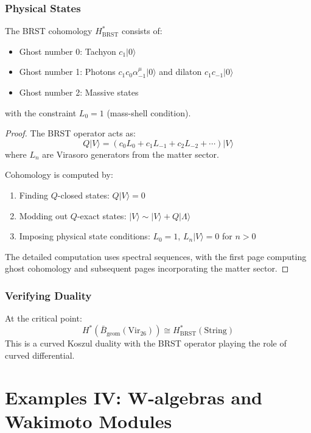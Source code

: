 \subsubsection{Physical States}
 
\begin{theorem}
The BRST cohomology $H^*_{\text{BRST}}$ consists of:
\begin{itemize}
\item Ghost number 0: Tachyon $c_1|0\rangle$
\item Ghost number 1: Photons $c_1c_0\alpha^\mu_{-1}|0\rangle$ and dilaton $c_1c_{-1}|0\rangle$
\item Ghost number 2: Massive states
\end{itemize}
with the constraint $L_0 = 1$ (mass-shell condition).
\end{theorem}
 
\begin{proof}
The BRST operator acts as:
\[
Q|V\rangle = \left(c_0L_0 + c_1L_{-1} + c_2L_{-2} + \cdots\right)|V\rangle
\]
where $L_n$ are Virasoro generators from the matter sector.
 
Cohomology is computed by:
\begin{enumerate}
\item Finding $Q$-closed states: $Q|V\rangle = 0$
\item Modding out $Q$-exact states: $|V\rangle \sim |V\rangle + Q|\Lambda\rangle$
\item Imposing physical state conditions: $L_0 = 1$, $L_n|V\rangle = 0$ for $n > 0$
\end{enumerate}
 
The detailed computation uses spectral sequences, with the first page computing ghost cohomology and 
subsequent pages incorporating the matter sector.
\end{proof}
 
\subsubsection{Verifying Duality}
 
\begin{theorem}
At the critical point:
\[
H^*(\bar{B}_{\text{geom}}(\text{Vir}_{26})) \cong H^*_{\text{BRST}}(\text{String})
\]
This is a curved Koszul duality with the BRST operator playing the role of curved differential.
\end{theorem}
 
\section{Examples IV: W-algebras and Wakimoto Modules}
 
